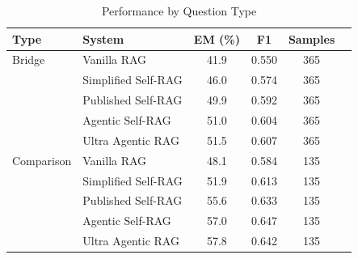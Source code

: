 
\begin{table}[h]
\centering
\caption{Performance by Question Type}
\label{tab:by_type}
\begin{tabular}{llcccc}
\toprule
Type & System & EM (\%) & F1 & Samples \\
\midrule
Bridge & Vanilla RAG & 41.9 & 0.550 & 365 \\
 & Simplified Self-RAG & 46.0 & 0.574 & 365 \\
 & Published Self-RAG & 49.9 & 0.592 & 365 \\
 & Agentic Self-RAG & 51.0 & 0.604 & 365 \\
 & Ultra Agentic RAG & 51.5 & 0.607 & 365 \\
Comparison & Vanilla RAG & 48.1 & 0.584 & 135 \\
 & Simplified Self-RAG & 51.9 & 0.613 & 135 \\
 & Published Self-RAG & 55.6 & 0.633 & 135 \\
 & Agentic Self-RAG & 57.0 & 0.647 & 135 \\
 & Ultra Agentic RAG & 57.8 & 0.642 & 135 \\
\bottomrule
\end{tabular}
\end{table}
